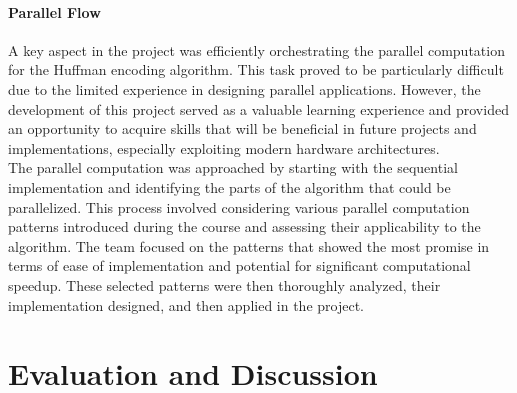 \documentclass[10pt]{article}
\begin{document}
\paragraph{Parallel Flow} A key aspect in the project was efficiently orchestrating the parallel computation for the Huffman encoding algorithm. This task proved to be particularly difficult due to the limited experience in designing parallel applications. However, the development of this project served as a valuable learning experience and provided an opportunity to acquire skills that will be beneficial in future projects and implementations, especially exploiting modern hardware architectures.\\
The parallel computation was approached by starting with the sequential implementation and identifying the parts of the algorithm that could be parallelized. This process involved considering various parallel computation patterns introduced during the course and assessing their applicability to the algorithm. The team focused on the patterns that showed the most promise in terms of ease of implementation and potential for significant computational speedup. These selected patterns were then thoroughly analyzed, their implementation designed, and then applied in the project.
\section{Evaluation and Discussion}
\end{document}
